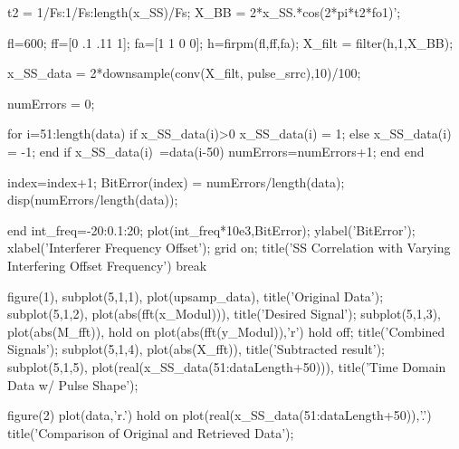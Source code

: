 t2 = 1/Fs:1/Fs:length(x_SS)/Fs;
X_BB = 2*x_SS.*cos(2*pi*t2*fo1)';


fl=600; 
ff=[0 .1 .11 1];
fa=[1 1 0 0];
h=firpm(fl,ff,fa);
X_filt = filter(h,1,X_BB);

x_SS_data = 2*downsample(conv(X_filt, pulse_srrc),10)/100;

numErrors = 0;

for i=51:length(data)
    if x_SS_data(i)>0
        x_SS_data(i) = 1;
    else
        x_SS_data(i) = -1;
    end
    if x_SS_data(i)~=data(i-50)
        numErrors=numErrors+1;
    end
end

index=index+1;
BitError(index) = numErrors/length(data);
disp(numErrors/length(data));

end
int_freq=-20:0.1:20;
plot(int_freq*10e3,BitError);
ylabel('BitError');
xlabel('Interferer Frequency Offset');
grid on;
title('SS Correlation with Varying Interfering Offset Frequency')
break

figure(1),
subplot(5,1,1),
plot(upsamp_data),
title('Original Data');
subplot(5,1,2),
plot(abs(fft(x_Modul))),
title('Desired Signal');
subplot(5,1,3),
plot(abs(M_fft)),
hold on
plot(abs(fft(y_Modul)),'r')
hold off;
title('Combined Signals');
subplot(5,1,4),
plot(abs(X_fft)),
title('Subtracted result');
subplot(5,1,5),
plot(real(x_SS_data(51:dataLength+50))),
title('Time Domain Data w/ Pulse Shape');

figure(2)
plot(data,'r.')
hold on
plot(real(x_SS_data(51:dataLength+50)),'.')
title('Comparison of Original and Retrieved Data');

